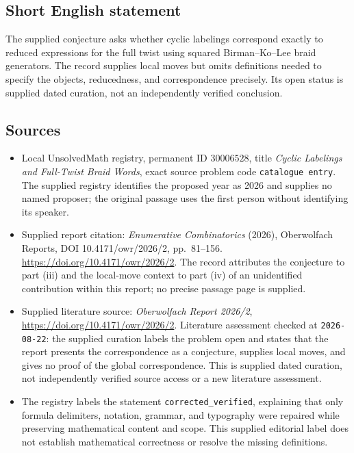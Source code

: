\documentclass[11pt]{article}
\begin{document}
\subsection{Short English statement}
The supplied conjecture asks whether cyclic labelings correspond exactly to reduced expressions for the full twist using squared Birman--Ko--Lee braid generators. The record supplies local moves but omits definitions needed to specify the objects, reducedness, and correspondence precisely. Its open status is supplied dated curation, not an independently verified conclusion.
\subsection{Sources}
\begin{itemize}
\item Local UnsolvedMath registry, permanent ID \(30006528\), title \emph{Cyclic Labelings and Full-Twist Braid Words}, exact source problem code \texttt{catalogue entry}. The supplied registry identifies the proposed year as 2026 and supplies no named proposer; the original passage uses the first person without identifying its speaker.
\item Supplied report citation: \emph{Enumerative Combinatorics} (2026), Oberwolfach Reports, DOI 10.4171/owr/2026/2, pp.\ 81--156. \url{https://doi.org/10.4171/owr/2026/2}. The record attributes the conjecture to part (iii) and the local-move context to part (iv) of an unidentified contribution within this report; no precise passage page is supplied.
\item Supplied literature source: \emph{Oberwolfach Report 2026/2}, \url{https://doi.org/10.4171/owr/2026/2}. Literature assessment checked at \texttt{2026-08-22}: the supplied curation labels the problem open and states that the report presents the correspondence as a conjecture, supplies local moves, and gives no proof of the global correspondence. This is supplied dated curation, not independently verified source access or a new literature assessment.
\item The registry labels the statement \texttt{corrected\_verified}, explaining that only formula delimiters, notation, grammar, and typography were repaired while preserving mathematical content and scope. This supplied editorial label does not establish mathematical correctness or resolve the missing definitions.
\end{itemize}
\end{document}
